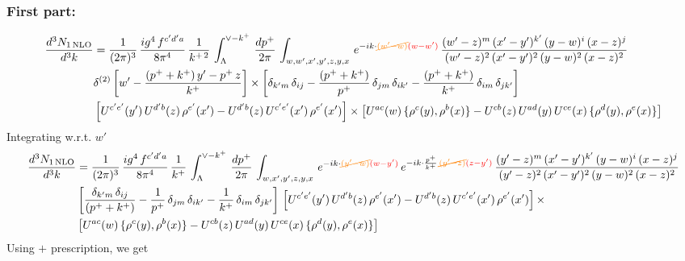 \documentclass[9pt]{article}
\numberwithin{equation}{section}
\begin{document}
\subsubsection{First part:\,}
\begin{align}
     \frac{d^{3}N_{1\,\rm NLO}}{d^{3}k} & =  \frac{1}{(2\pi)^{3}}\,\frac{ig^{4}\,f^{c'd'a}}{8\pi^{4}}\, \frac{1}{k^{+\,2}}\,\int_{\Lambda}^{\vee-k^{+}}\, \frac{dp^{+}}{2\pi}\, \int_{w,w',x',y',z,y,x}\, e^{-ik\cdot {\color{orange}\cancel{(w'-w)}}{\color{red}(w-w')}}\, \frac{(w'-z)^{m}\,(x'-y')^{k'}\,(y-w)^{i}\,(x-z)^{j}}{(w'-z)^{2}\,(x'-y')^{2}\,(y-w)^{2}\,(x-z)^{2}}\notag \\ & \delta^{(2)}\left[w'-\frac{(p^{+}+k^{+})\,y'-p^{+}\,z}{k^{+}}\right]\times \left[\delta_{k'm}\,\delta_{ij}-\frac{(p^{+}+k^{+})}{p^{+}}\,\delta_{jm}\,\delta_{ik'}-\frac{(p^{+}+k^{+})}{k^{+}}\, \delta_{im}\, \delta_{jk'}\right]\notag \\ & \left[U^{c'e'}(y')\,U^{d'b}(z)\,\rho^{e'}(x')-U^{d'b}(z)\,U^{c'e'}(x')\,\rho^{e'}(x')\right]\times \left[U^{ac}(w)\, \{\rho^{c}(y),\rho^{b}(x)\}-U^{cb}(z)\,U^{ad}(y)\,U^{ce}(x)\,\{\rho^{d}(y),\rho^{e}(x)\}\right]
\end{align}
Integrating w.r.t. $w'$
\begin{align}
     \frac{d^{3}N_{1\,\rm NLO}}{d^{3}k} & = \frac{1}{(2\pi)^{3}}\, \frac{ig^{4}\,f^{c'd'a}}{8\pi^{4}}\, \frac{1}{k^{+}}\,\int_{\Lambda}^{\vee-k^{+}}\,  \frac{dp^{+}}{2\pi}\, \int_{w,x',y',z,y,x}\, e^{-ik\cdot {\color{orange}\cancel{(y'-w)}}{\color{red}(w-y')}}\, e^{-ik\cdot \frac{p^{+}}{k^{+}}\,{\color{orange}\cancel{(y'-z)}}{\color{red}(z-y')}}\,\frac{(y'-z)^{m}\,(x'-y')^{k'}\,(y-w)^{i}\,(x-z)^{j}}{(y'-z)^{2}\,(x'-y')^{2}\,(y-w)^{2}\,(x-z)^{2}}\notag \\ & \left[\frac{\delta_{k'm}\,\delta_{ij}}{(p^{+}+k^{+})}-\frac{1}{p^{+}}\,\delta_{jm}\,\delta_{ik'}-\frac{1}{k^{+}}\, \delta_{im}\, \delta_{jk'}\right]\, \left[U^{c'e'}(y')\,U^{d'b}(z)\,\rho^{e'}(x')-U^{d'b}(z)\,U^{c'e'}(x')\,\rho^{e'}(x')\right]\times\notag \\ &  \left[U^{ac}(w)\, \{\rho^{c}(y),\rho^{b}(x)\}-U^{cb}(z)\,U^{ad}(y)\,U^{ce}(x)\,\{\rho^{d}(y),\rho^{e}(x)\}\right]
\end{align} 
Using $+$ prescription, we get
\end{document}
